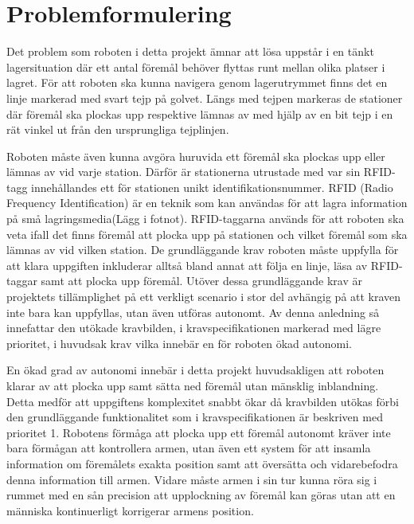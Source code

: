 

\section{Problemformulering}

Det problem som roboten i detta projekt ämnar att lösa uppstår i en tänkt lagersituation där ett antal föremål behöver flyttas runt mellan olika platser i lagret. För att roboten ska kunna navigera genom lagerutrymmet finns det en linje markerad med svart tejp på golvet. Längs med tejpen markeras de stationer där föremål ska plockas upp respektive lämnas av med hjälp av en bit tejp i en rät vinkel ut från den ursprungliga tejplinjen.


Roboten måste även kunna avgöra huruvida ett föremål ska plockas upp eller lämnas av vid varje station. Därför är stationerna utrustade med var sin RFID-tagg innehållandes ett för stationen unikt identifikationsnummer. RFID (Radio Frequency Identification) är en teknik som kan användas för att lagra information på små lagringsmedia(Lägg i fotnot). RFID-taggarna används för att roboten ska veta ifall det finns föremål att plocka upp på stationen och vilket föremål som ska lämnas av vid vilken station.
De grundläggande krav roboten måste uppfylla för att klara uppgiften inkluderar alltså bland annat att följa en linje, läsa av RFID-taggar samt att plocka upp föremål. Utöver dessa grundläggande krav är projektets tillämplighet på ett verkligt scenario i stor del avhängig på att kraven inte bara kan uppfyllas, utan även utföras autonomt. Av denna anledning så innefattar den utökade kravbilden, i kravspecifikationen markerad med lägre prioritet, i huvudsak krav vilka innebär en för roboten ökad autonomi.

En ökad grad av autonomi innebär i detta projekt huvudsakligen att roboten klarar av att plocka upp samt sätta ned föremål utan mänsklig inblandning. Detta medför att uppgiftens komplexitet snabbt ökar då kravbilden utökas förbi den grundläggande funktionalitet som i kravspecifikationen är beskriven med prioritet 1. Robotens förmåga att plocka upp ett föremål autonomt kräver inte bara förmågan att kontrollera armen, utan även ett system för att insamla information om föremålets exakta position samt att översätta och vidarebefodra denna information till armen. Vidare måste armen i sin tur kunna röra sig i rummet med en sån precision att upplockning av föremål kan göras utan att en människa kontinuerligt korrigerar armens position.
